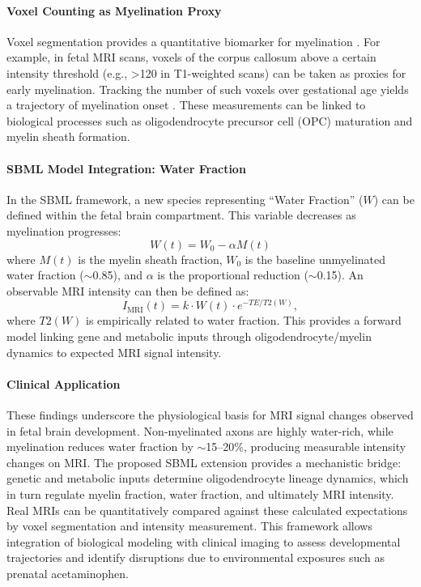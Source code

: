 \documentclass[11pt]{article}
\begin{document}
\paragraph{Voxel Counting as Myelination Proxy}
Voxel segmentation provides a quantitative biomarker for myelination \citep{gimenez2008}. For example, in fetal MRI scans, voxels of the corpus callosum above a certain intensity threshold (e.g., >120 in T1-weighted scans) can be taken as proxies for early myelination. Tracking the number of such voxels over gestational age yields a trajectory of myelination onset \citep{arshad2024}. These measurements can be linked to biological processes such as oligodendrocyte precursor cell (OPC) maturation and myelin sheath formation.

\paragraph{SBML Model Integration: Water Fraction}
In the SBML framework, a new species representing ``Water Fraction'' ($W$) can be defined within the fetal brain compartment. This variable decreases as myelination progresses:
\begin{equation}
W(t) = W_0 - \alpha M(t)
\end{equation}
where $M(t)$ is the myelin sheath fraction, $W_0$ is the baseline unmyelinated water fraction ($\sim$0.85), and $\alpha$ is the proportional reduction ($\sim$0.15). An observable MRI intensity can then be defined as:
\begin{equation}
I_{\text{MRI}}(t) = k \cdot W(t) \cdot e^{-TE/T2(W)},
\end{equation}
where $T2(W)$ is empirically related to water fraction. This provides a forward model linking gene and metabolic inputs through oligodendrocyte/myelin dynamics to expected MRI signal intensity.

\paragraph{Clinical Application}
These findings underscore the physiological basis for MRI signal changes observed in fetal brain development. Non-myelinated axons are highly water-rich, while myelination reduces water fraction by $\sim$15--20\%, producing measurable intensity changes on MRI. The proposed SBML extension provides a mechanistic bridge: genetic and metabolic inputs determine oligodendrocyte lineage dynamics, which in turn regulate myelin fraction, water fraction, and ultimately MRI intensity. Real MRIs can be quantitatively compared against these calculated expectations by voxel segmentation and intensity measurement. This framework allows integration of biological modeling with clinical imaging to assess developmental trajectories and identify disruptions due to environmental exposures such as prenatal acetaminophen.
\end{document}
